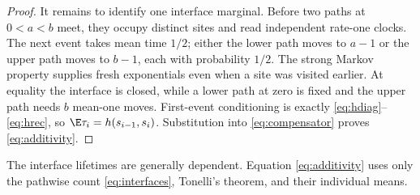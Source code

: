 \begin{proof}
It remains to identify one interface marginal.  Before two paths at
$0<a<b$ meet, they occupy distinct sites and read independent rate-one
clocks.  The next event takes mean time $1/2$; either the lower path moves to
$a-1$ or the upper path moves to $b-1$, each with probability $1/2$.
The strong Markov property supplies fresh exponentials even when a site was
visited earlier.  At equality the interface is closed, while a lower path at
zero is fixed and the upper path needs $b$ mean-one moves.  First-event
conditioning is exactly \eqref{eq:hdiag}--\eqref{eq:hrec}, so
$\E\tau_i=h(s_{i-1},s_i)$.  Substitution into
\eqref{eq:compensator} proves \eqref{eq:additivity}.
\end{proof}

\begin{remark}
The interface lifetimes are generally dependent.  Equation
\eqref{eq:additivity} uses only the pathwise count
\eqref{eq:interfaces}, Tonelli's theorem, and their individual means.
\end{remark}
